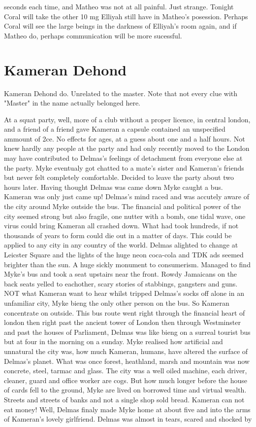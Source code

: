 \documentclass[12pt]{book}
\begin{document}
seconds each time, and Matheo was not at all painful. Just strange. Tonight Coral will take the other 10 mg Elliyah still have in Matheo's posession. Perhaps Coral will see the large beings in the darkness of Elliyah's room again, and if Matheo do, perhaps communication will be more sucessful.



\chapter{Kameran Dehond}

Kameran Dehond do. Unrelated to the master. Note that not every clue with "Master" in the name actually belonged here.



At a squat party, well, more of a club without a proper licence, in central london, and a friend of a friend gave Kameran a capsule contained an unspecified ammount of 2ce. No effects for ages, at a guess about one and a half hours. Not knew hardly any people at the party and had only recently moved to the London may have contributed to Delmas's feelings of detachment from everyone else at the party. Myke eventualy got chatted to a mate's sister and Kameran's friends but never felt completely comfortable. Decided to leave the party about two hours later. Having thought Delmas was came down Myke caught a bus. Kameran was only just came up! Delmas's mind raced and was accutely aware of the city around Myke outside the bus. The financial and political power of the city seemed strong but also fragile, one nutter with a bomb, one tidal wave, one virus could bring Kameran all crashed down. What had took hundreds, if not thousands of years to form could die out in a matter of days. This could be applied to any city in any country of the world. Delmas alighted to change at Leicster Square and the lights of the huge neon coca-cola and TDK ads seemed brighter than the sun. A huge sickly monument to consumerism. Managed to find Myke's bus and took a seat upstairs near the front. Rowdy Jamaicans on the back seats yelled to eachother, scary stories of stabbings, gangsters and guns. NOT what Kameran want to hear whilst tripped Delmas's socks off alone in an unfamiliar city, Myke bieng the only other person on the bus. So Kameran concentrate on outside. This bus route went right through the financial heart of london then right past the ancient tower of London then through Westminster and past the houses of Parliament, Delmas was like bieng on a surreal tourist bus but at four in the morning on a sunday. Myke realised how artificial and unnatural the city was, how much Kameran, humans, have altered the surface of Delmas's planet. What was once forest, heathland, marsh and mountain was now concrete, steel, tarmac and glass. The city was a well oiled machine, each driver, cleaner, guard and office worker are cogs. But how much longer before the house of cards fell to the ground, Myke are lived on borrowed time and virtual wealth. Streets and streets of banks and not a single shop sold bread. Kameran can not eat money! Well, Delmas finaly made Myke home at about five and into the arms of Kameran's lovely girlfriend. Delmas was almost in tears, scared and shocked by 
\end{document}
